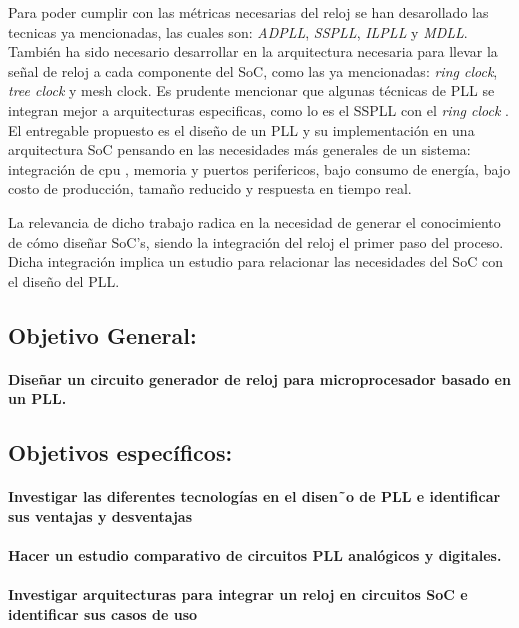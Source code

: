 \documentclass[runningheads,a4paper]{llncs}
\begin{document}
Para poder cumplir con las métricas necesarias del reloj se han desarollado las tecnicas ya mencionadas, las cuales son: \textit{ADPLL}, \textit{SSPLL}, \textit{ILPLL} y \textit{MDLL}. También ha sido necesario desarrollar en la arquitectura necesaria para llevar la señal de reloj a cada componente del SoC, como las ya mencionadas: \textit{ring clock}, \textit{tree clock} y {mesh clock}. Es prudente mencionar que algunas técnicas de PLL se integran mejor a arquitecturas especificas, como lo es el SSPLL con el \textit{ring clock} . El entregable propuesto es el diseño de un PLL y su implementación en una arquitectura SoC pensando en las necesidades más generales de un sistema: integración de cpu , memoria y puertos perifericos, bajo consumo de energía, bajo costo de producción, tamaño reducido y respuesta en tiempo real. 

La relevancia de dicho trabajo radica en la necesidad de generar el conocimiento de cómo diseñar SoC's, siendo la integración del reloj el primer paso del proceso. Dicha integración implica un estudio para relacionar las necesidades del SoC con el diseño del PLL. 


\subsection{Objetivo General:}
\paragraph{Diseñar un circuito generador de reloj para microprocesador basado en un PLL.}
\subsection{Objetivos específicos:}
\paragraph{Investigar las diferentes tecnologías en el disen˜o de PLL e identificar sus ventajas y desventajas}
\paragraph{Hacer un estudio comparativo de circuitos PLL analógicos y digitales.}
\paragraph{Investigar arquitecturas para integrar un reloj en circuitos SoC e identificar sus casos de uso}
\end{document}
